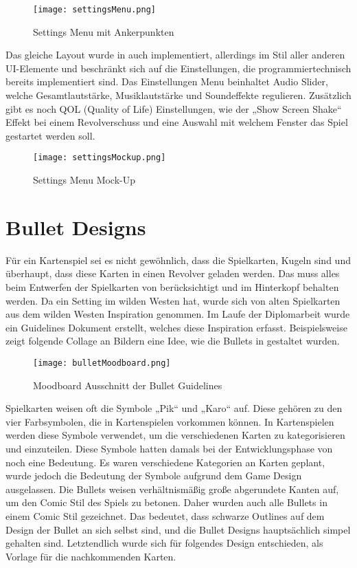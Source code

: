\begin{figure}[H]
    \centering
    \texttt{[image: settingsMenu.png]}
    \caption{Settings Menu mit Ankerpunkten}
\end{figure}

Das gleiche Layout wurde in \FF auch implementiert, allerdings im Stil aller anderen UI-Elemente und beschränkt sich auf die Einstellungen, die programmiertechnisch bereits implementiert sind. Das Einstellungen Menu beinhaltet Audio Slider, welche Gesamtlautstärke, Musiklautstärke und Soundeffekte regulieren. Zusätzlich gibt es noch QOL (Quality of Life) Einstellungen, wie der „Show Screen Shake“ Effekt bei einem Revolverschuss und eine Auswahl mit welchem Fenster das Spiel gestartet werden soll.

\begin{figure}[H]
    \centering
    \texttt{[image: settingsMockup.png]}
    \caption{Settings Menu Mock-Up}
\end{figure}

\section{Bullet Designs}

Für ein Kartenspiel sei es nicht gewöhnlich, dass die Spielkarten, Kugeln sind und überhaupt, dass diese Karten in einen Revolver geladen werden. Das muss alles beim Entwerfen der Spielkarten von \FF berücksichtigt und im Hinterkopf behalten werden. Da \FF ein Setting im wilden Westen hat, wurde sich von alten Spielkarten aus dem wilden Westen Inspiration genommen. Im Laufe der Diplomarbeit wurde ein Guidelines Dokument erstellt, welches diese Inspiration erfasst. Beispielsweise zeigt folgende Collage an Bildern eine Idee, wie die Bullets in \FF gestaltet wurden.

\begin{figure}[H]
    \centering
    \texttt{[image: bulletMoodboard.png]}
    \caption{Moodboard Ausschnitt der Bullet Guidelines}
\end{figure}

Spielkarten weisen oft die Symbole „Pik“ und „Karo“ auf. Diese gehören zu den vier Farbsymbolen, die in Kartenspielen vorkommen können. In Kartenspielen werden diese Symbole verwendet, um die verschiedenen Karten zu kategorisieren und einzuteilen. Diese Symbole hatten damals bei der Entwicklungsphase von \FF noch eine Bedeutung. Es waren verschiedene Kategorien an Karten geplant, wurde jedoch die Bedeutung der Symbole aufgrund dem Game Design ausgelassen. Die Bullets weisen verhältnismäßig große abgerundete Kanten auf, um den Comic Stil des Spiels zu betonen. Daher wurden auch alle Bullets in einem Comic Stil gezeichnet. Das bedeutet, dass schwarze Outlines auf dem Design der Bullet an sich selbst sind, und die Bullet Designs hauptsächlich simpel gehalten sind. Letztendlich wurde sich für folgendes Design entschieden, als Vorlage für die nachkommenden Karten.


